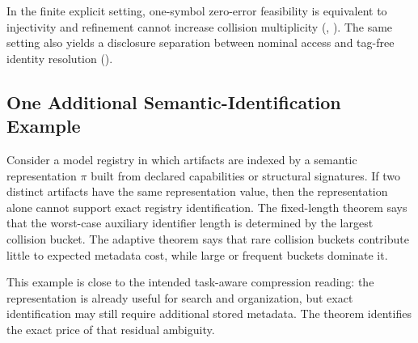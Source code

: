 In the finite explicit setting, one-symbol zero-error feasibility is equivalent to injectivity and refinement cannot increase collision multiplicity (, ). The same setting also yields a disclosure separation between nominal access and tag-free identity resolution ().

\subsection{One Additional Semantic-Identification Example}

Consider a model registry in which artifacts are indexed by a semantic representation $\pi$ built from declared capabilities or structural signatures. If two distinct artifacts have the same representation value, then the representation alone cannot support exact registry identification. The fixed-length theorem says that the worst-case auxiliary identifier length is determined by the largest collision bucket. The adaptive theorem says that rare collision buckets contribute little to expected metadata cost, while large or frequent buckets dominate it.

This example is close to the intended task-aware compression reading: the representation is already useful for search and organization, but exact identification may still require additional stored metadata. The theorem identifies the exact price of that residual ambiguity.
